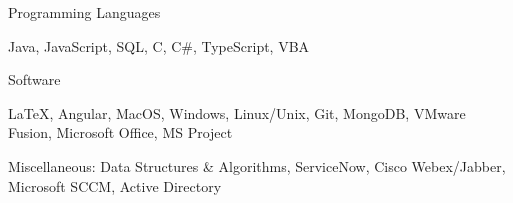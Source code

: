 \begin{cventries}
  \cventry
    {Programming Languages}
    { }
    { }
    { }
    {
      \begin{cvitems}
        \item {Java, JavaScript, SQL, C, C\#, TypeScript, VBA}
      \end{cvitems}
    }
  \cventry
    {Software}
    { }
    { }
    { }
    {
      \begin{cvitems}
        \item {LaTeX, Angular, MacOS, Windows, Linux/Unix, Git, MongoDB, VMware Fusion, Microsoft Office, MS Project}
        \item {Miscellaneous: Data Structures \& Algorithms, ServiceNow, Cisco Webex/Jabber, Microsoft SCCM, Active Directory }
      \end{cvitems}
    }
\end{cventries}
